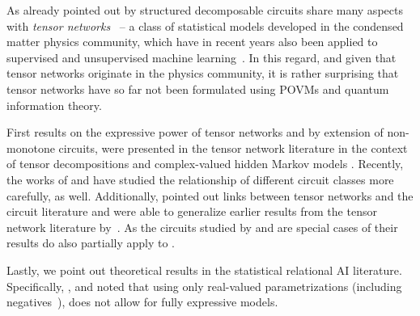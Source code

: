 As already pointed out by \citet{loconte2024subtractive,loconte2025sum,loconte2025relationship} structured decomposable circuits share many aspects with \textit{tensor networks}~\citep{orus2014practical,white1992density} -- a class of statistical models developed in the condensed matter physics community, which have in recent years also been applied to supervised and unsupervised machine learning~\citep{cheng2019tree,han2018unsupervised,stoudenmire2016supervised}. In this regard, and given that tensor networks originate in the physics community, it is rather surprising that tensor networks have so far not been formulated using POVMs and quantum information theory.

First results on the expressive power of tensor networks and by extension of non-monotone circuits, were presented in the tensor network literature in the context of tensor decompositions \citep{glasser2019expressive} and complex-valued hidden Markov models \citep{gao2022enhancing}. Recently, the works of \citet{loconte2024subtractive,loconte2025sum} and \citet{wangrelationship} have studied the relationship of different circuit classes more carefully, as well. Additionally, \citet{loconte2025sum} pointed out links between tensor networks and the circuit literature and were able to generalize earlier results from the tensor network literature by~\citet{glasser2019expressive}.
As the circuits studied by \citet{loconte2025sum} and \citet{wangrelationship} are special cases of \dpuncs their results do also partially apply to \dpuncs.


Lastly, we point out theoretical results in the statistical relational AI literature. Specifically, \citet{buchman2017rules}, and \citet{kuzelka2020complex} noted that using only real-valued parametrizations (including negatives~\citep{buchman2017negative}), does not allow for fully expressive models.





